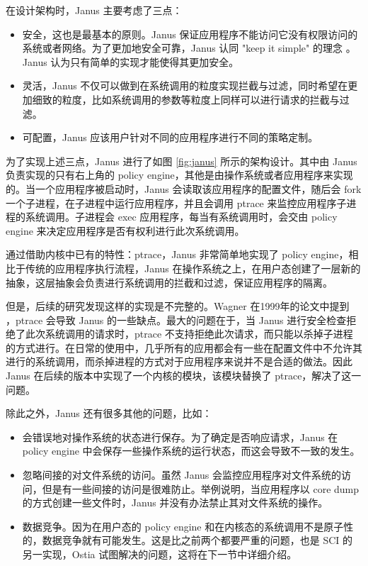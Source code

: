 \documentclass[final,5p,times]{elsarticle}
\begin{document}
在设计架构时，Janus 主要考虑了三点：

\begin{itemize}
\item
安全，这也是最基本的原则。Janus 保证应用程序不能访问它没有权限访问的系统或者网络。为了更加地安全可靠，Janus 认同 "keep it simple" 的理念 \cite{keepitsimple}。Janus 认为只有简单的实现才能使得其更加安全。
\item
灵活，Janus 不仅可以做到在系统调用的粒度实现拦截与过滤，同时希望在更加细致的粒度，比如系统调用的参数等粒度上同样可以进行请求的拦截与过滤。
\item
可配置，Janus 应该用户针对不同的应用程序进行不同的策略定制。
\end{itemize}

为了实现上述三点，Janus 进行了如图 \ref{fig:janus} 所示的架构设计。其中由 Janus 负责实现的只有右上角的 policy engine，其他是由操作系统或者应用程序来实现的。当一个应用程序被启动时，Janus 会读取该应用程序的配置文件，随后会 fork 一个子进程，在子进程中运行应用程序，并且会调用 ptrace 来监控应用程序子进程的系统调用。子进程会 exec 应用程序，每当有系统调用时，会交由 policy engine 来决定应用程序是否有权利进行此次系统调用。

通过借助内核中已有的特性：ptrace，Janus 非常简单地实现了 policy engine，相比于传统的应用程序执行流程，Janus 在操作系统之上，在用户态创建了一层新的抽象，这层抽象会负责进行系统调用的拦截和过滤，保证应用程序的隔离。

但是，后续的研究发现这样的实现是不完整的。Wagner 在1999年的论文中提到 \cite{wagner1999janus}，ptrace 会导致 Janus 的一些缺点。最大的问题在于，当 Janus 进行安全检查拒绝了此次系统调用的请求时，ptrace 不支持拒绝此次请求，而只能以杀掉子进程的方式进行。在日常的使用中，几乎所有的应用都会有一些在配置文件中不允许其进行的系统调用，而杀掉进程的方式对于应用程序来说并不是合适的做法。因此 Janus 在后续的版本中实现了一个内核的模块，该模块替换了 ptrace，解决了这一问题。

除此之外，Janus 还有很多其他的问题，比如：

\begin{itemize}
\item
会错误地对操作系统的状态进行保存。为了确定是否响应请求，Janus 在 policy engine 中会保存一些操作系统的运行状态，而这会导致不一致的发生。
\item
忽略间接的对文件系统的访问。虽然 Janus 会监控应用程序对文件系统的访问，但是有一些间接的访问是很难防止。举例说明，当应用程序以 core dump 的方式创建一些文件时，Janus 并没有办法禁止其对文件系统的操作。
\item
数据竞争。因为在用户态的 policy engine 和在内核态的系统调用不是原子性的，数据竞争就有可能发生。这是比之前两个都要严重的问题，也是 SCI 的另一实现，Ostia 试图解决的问题\cite{garfinkel2003traps}，这将在下一节中详细介绍。
\end{itemize}
\end{document}
